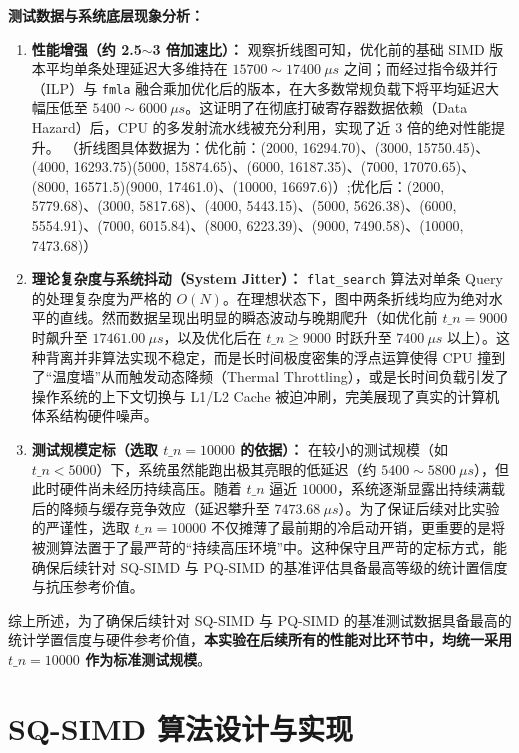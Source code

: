 \documentclass[UTF8,a4paper,10pt]{ctexart}
\begin{document}
\textbf{测试数据与系统底层现象分析：}
\begin{enumerate}
    \item \textbf{性能增强（约 2.5$\sim$3 倍加速比）：} 观察折线图可知，优化前的基础 SIMD 版本平均单条处理延迟大多维持在 $15700 \sim 17400\ \mu s$ 之间；而经过指令级并行（ILP）与 \texttt{fmla} 融合乘加优化后的版本，在大多数常规负载下将平均延迟大幅压低至 $5400 \sim 6000\ \mu s$。这证明了在彻底打破寄存器数据依赖（Data Hazard）后，CPU 的多发射流水线被充分利用，实现了近 3 倍的绝对性能提升。
    （折线图具体数据为：优化前：(2000, 16294.70)、(3000, 15750.45)、(4000, 16293.75)(5000, 15874.65)、(6000, 16187.35)、(7000,  17070.65)、(8000, 16571.5)(9000, 17461.0)、(10000, 16697.6)）;优化后：(2000, 5779.68)、(3000, 5817.68)、(4000, 5443.15)、(5000, 5626.38)、(6000, 5554.91)、(7000, 6015.84)、(8000, 6223.39)、(9000, 7490.58)、(10000,  7473.68)）
    \item \textbf{理论复杂度与系统抖动（System Jitter）：} \texttt{flat\_search} 算法对单条 Query 的处理复杂度为严格的 $O(N)$。在理想状态下，图中两条折线均应为绝对水平的直线。然而数据呈现出明显的瞬态波动与晚期爬升（如优化前 $t\_n=9000$ 时飙升至 $17461.00\ \mu s$，以及优化后在 $t\_n \ge 9000$ 时跃升至 $7400\ \mu s$ 以上）。这种背离并非算法实现不稳定，而是长时间极度密集的浮点运算使得 CPU 撞到了“温度墙”从而触发动态降频（Thermal Throttling），或是长时间负载引发了操作系统的上下文切换与 L1/L2 Cache 被迫冲刷，完美展现了真实的计算机体系结构硬件噪声。
    
    \item \textbf{测试规模定标（选取 $t\_n = 10000$ 的依据）：} 在较小的测试规模（如 $t\_n < 5000$）下，系统虽然能跑出极其亮眼的低延迟（约 $5400 \sim 5800\ \mu s$），但此时硬件尚未经历持续高压。随着 $t\_n$ 逼近 $10000$，系统逐渐显露出持续满载后的降频与缓存竞争效应（延迟攀升至 $7473.68\ \mu s$）。为了保证后续对比实验的严谨性，选取 $t\_n = 10000$ 不仅摊薄了最前期的冷启动开销，更重要的是将被测算法置于了最严苛的“持续高压环境”中。这种保守且严苛的定标方式，能确保后续针对 SQ-SIMD 与 PQ-SIMD 的基准评估具备最高等级的统计置信度与抗压参考价值。
\end{enumerate}

综上所述，为了确保后续针对 SQ-SIMD 与 PQ-SIMD 的基准测试数据具备最高的统计学置信度与硬件参考价值，\textbf{本实验在后续所有的性能对比环节中，均统一采用 $t\_n = 10000$ 作为标准测试规模}。




\section{SQ-SIMD 算法设计与实现}
\end{document}
